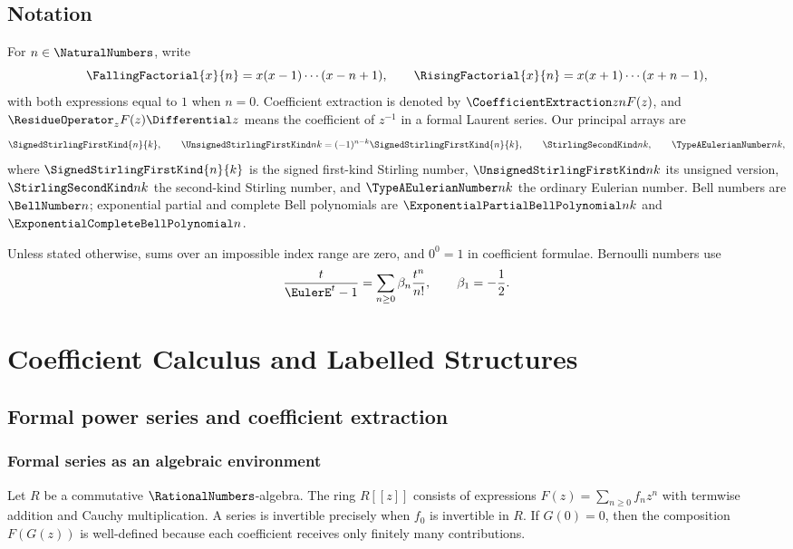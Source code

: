 \documentclass[11pt,a4paper,oneside,openany]{book}
\theoremstyle{definition}
\theoremstyle{remark}
\begin{document}
\tableofcontents

\chapter*{Notation}
For $n\in\NaturalNumbers$, write
\[
 \FallingFactorial{x}{n}=x(x-1)\cdots(x-n+1),\qquad
 \RisingFactorial{x}{n}=x(x+1)\cdots(x+n-1),
\]
with both expressions equal to $1$ when $n=0$.  Coefficient extraction is denoted by
$\CoefficientExtraction z n F(z)$, and $\ResidueOperator_z F(z)\Differential z$ means the coefficient of $z^{-1}$ in a
formal Laurent series.  Our principal arrays are
\[
 \SignedStirlingFirstKind{n}{k},\qquad \UnsignedStirlingFirstKind nk=(-1)^{n-k}\SignedStirlingFirstKind{n}{k},\qquad
 \StirlingSecondKind nk,\qquad \TypeAEulerianNumber nk,
\]
where $\SignedStirlingFirstKind{n}{k}$ is the signed first-kind Stirling number, $\UnsignedStirlingFirstKind nk$ its unsigned
version, $\StirlingSecondKind nk$ the second-kind Stirling number, and $\TypeAEulerianNumber nk$ the
ordinary Eulerian number.  Bell numbers are $\BellNumber n$; exponential partial and
complete Bell polynomials are $\ExponentialPartialBellPolynomial nk$ and $\ExponentialCompleteBellPolynomial n$.

Unless stated otherwise, sums over an impossible index range are zero, and
$0^0=1$ in coefficient formulae.  Bernoulli numbers use
\[
 \frac{t}{\EulerE^t-1}=\sum_{n\ge0}\beta_n\frac{t^n}{n!},
 \qquad \beta_1=-\frac12.
\]

\mainmatter

\part{Coefficient Calculus and Labelled Structures}

\chapter{Formal power series and coefficient extraction}
\label{ch:formal}

\section{Formal series as an algebraic environment}
Let $R$ be a commutative $\RationalNumbers$-algebra.  The ring $R[[z]]$ consists of expressions
$F(z)=\sum_{n\ge0}f_nz^n$ with termwise addition and Cauchy multiplication.  A series
is invertible precisely when $f_0$ is invertible in $R$.  If $G(0)=0$, then the
composition $F(G(z))$ is well-defined because each coefficient receives only
finitely many contributions.
\end{document}
